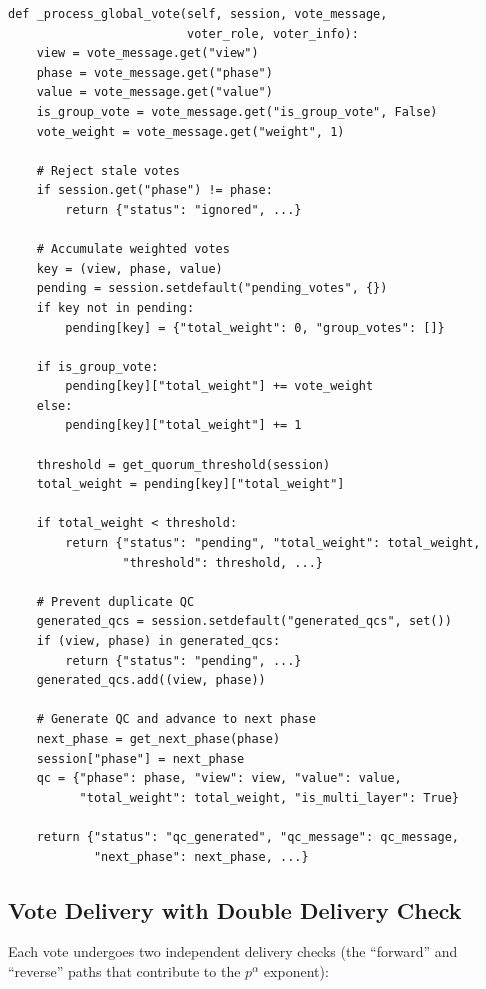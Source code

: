 \documentclass[12pt,a4paper]{article}
\begin{document}
\begin{lstlisting}[caption={Global vote aggregation (\texttt{consensus\_service.py})}, label=lst:global]
def _process_global_vote(self, session, vote_message,
                         voter_role, voter_info):
    view = vote_message.get("view")
    phase = vote_message.get("phase")
    value = vote_message.get("value")
    is_group_vote = vote_message.get("is_group_vote", False)
    vote_weight = vote_message.get("weight", 1)

    # Reject stale votes
    if session.get("phase") != phase:
        return {"status": "ignored", ...}

    # Accumulate weighted votes
    key = (view, phase, value)
    pending = session.setdefault("pending_votes", {})
    if key not in pending:
        pending[key] = {"total_weight": 0, "group_votes": []}

    if is_group_vote:
        pending[key]["total_weight"] += vote_weight
    else:
        pending[key]["total_weight"] += 1

    threshold = get_quorum_threshold(session)
    total_weight = pending[key]["total_weight"]

    if total_weight < threshold:
        return {"status": "pending", "total_weight": total_weight,
                "threshold": threshold, ...}

    # Prevent duplicate QC
    generated_qcs = session.setdefault("generated_qcs", set())
    if (view, phase) in generated_qcs:
        return {"status": "pending", ...}
    generated_qcs.add((view, phase))

    # Generate QC and advance to next phase
    next_phase = get_next_phase(phase)
    session["phase"] = next_phase
    qc = {"phase": phase, "view": view, "value": value,
          "total_weight": total_weight, "is_multi_layer": True}

    return {"status": "qc_generated", "qc_message": qc_message,
            "next_phase": next_phase, ...}
\end{lstlisting}

\subsection{Vote Delivery with Double Delivery Check}

Each vote undergoes two independent delivery checks (the ``forward'' and ``reverse'' paths that contribute to the $p^{\alpha}$ exponent):
\end{document}
